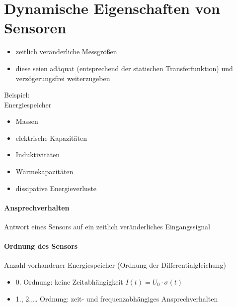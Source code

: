 \documentclass{scrreprt}
\begin{document}
\section{Dynamische Eigenschaften von Sensoren}
\begin{itemize}
\item zeitlich veränderliche Messgrößen
\item diese seien adäquat (entsprechend der statischen Transferfunktion) und verzögerungsfrei weiterzugeben
\end{itemize}
Beispiel:\\
Energiespeicher
\begin{itemize}
\item Massen
\item elektrische Kapazitäten
\item Induktivitäten
\item Wärmekapazitäten
\item dissipative Energieverluste
\end{itemize}

\paragraph{Ansprechverhalten} Antwort eines Sensors auf ein zeitlich veränderliches Eingangssignal

\paragraph{Ordnung des Sensors} Anzahl vorhandener Energiespeicher (Ordnung der Differentialgleichung)
\begin{itemize}
\item 0. Ordnung: keine Zeitabhängigkeit $I(t) = U_0 \cdot \sigma (t)$
\item 1., 2.,… Ordnung: zeit- und frequenzabhängiges Ansprechverhalten
\end{itemize}
\end{document}
